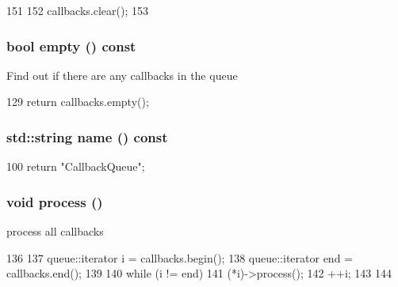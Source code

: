 \begin{DoxyCode}
151     {
152         callbacks.clear();
153     }
\end{DoxyCode}
\hypertarget{classCallbackQueue_ac6e61de369e994009e36f344f99c15ad}{
\subsubsection[{empty}]{\setlength{\rightskip}{0pt plus 5cm}bool empty () const}}
\label{classCallbackQueue_ac6e61de369e994009e36f344f99c15ad}
Find out if there are any callbacks in the queue 


\begin{DoxyCode}
129 { return callbacks.empty(); }
\end{DoxyCode}
\hypertarget{classCallbackQueue_a37627d5d5bba7f4a8690c71c2ab3cb07}{
\subsubsection[{name}]{\setlength{\rightskip}{0pt plus 5cm}std::string name () const}}
\label{classCallbackQueue_a37627d5d5bba7f4a8690c71c2ab3cb07}



\begin{DoxyCode}
100 { return "CallbackQueue"; }
\end{DoxyCode}
\hypertarget{classCallbackQueue_a2e9c5136d19b1a95fc427e0852deab5c}{
\subsubsection[{process}]{\setlength{\rightskip}{0pt plus 5cm}void process ()}}
\label{classCallbackQueue_a2e9c5136d19b1a95fc427e0852deab5c}
process all callbacks 


\begin{DoxyCode}
136     {
137         queue::iterator i = callbacks.begin();
138         queue::iterator end = callbacks.end();
139 
140         while (i != end) {
141             (*i)->process();
142             ++i;
143         }
144     }
\end{DoxyCode}



